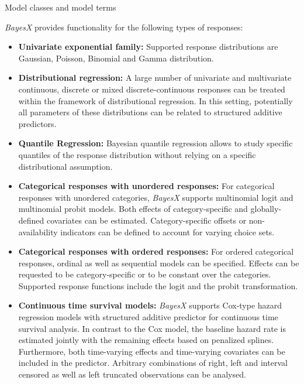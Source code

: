 \begin{stanza}{Model classes and model terms}

{\em BayesX} provides functionality for the following types of
responses:

\begin{itemize}
\item{\bf\sffamily Univariate exponential family:} Supported response distributions are Gaussian, Poisson, Binomial and Gamma distribution. 

\item {\bf\sffamily Distributional regression:} A large number of univariate and multivariate continuous, discrete or mixed discrete-continuous responses can be treated within the framework of distributional regression. In this setting, potentially all parameters of these distributions can be related to structured additive predictors.

\item {\bf\sffamily Quantile Regression:} Bayesian quantile regression allows to study specific quantiles of the response distribution without relying on a specific distributional assumption.

\item{\bf\sffamily Categorical responses with unordered responses:} For categorical responses with unordered categories,
    {\em BayesX} supports multinomial logit and multinomial probit models. Both effects of category-specific and
    globally-defined covariates can be estimated. Category-specific offsets or non-availability indicators can be defined
    to account for varying choice sets.

\item{\bf\sffamily Categorical responses with ordered responses:} For ordered categorical responses, ordinal as well as
    sequential models can be specified. Effects can be requested to be category-specific or to be constant over the
    categories. Supported response functions include the logit and the probit transformation.

\item{\bf\sffamily Continuous time survival models:} {\em BayesX} supports Cox-type hazard regression models with
    structured additive predictor for continuous time survival analysis. In contrast to the Cox model, the baseline hazard
    rate is estimated jointly with the remaining effects based on penalized splines. Furthermore, both time-varying effects
    and time-varying covariates can be included in the predictor. Arbitrary combinations of right, left and interval
    censored as well as left truncated observations can be analysed.


\end{itemize}
\end{stanza}
